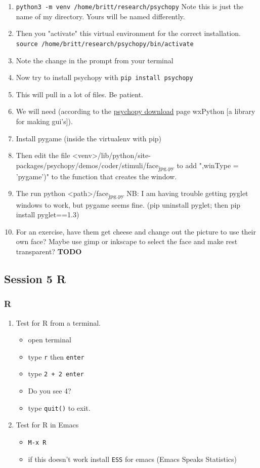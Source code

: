\documentclass{article}
\begin{document}
\begin{enumerate}
\begin{enumerate}
\begin{enumerate}
\begin{enumerate}
\item \texttt{python3 -m venv /home/britt/research/psychopy}
Note this is just the name of my directory. Yours will be named differently.
\item Then you "activate" this virtual environment for the correct installation.
\texttt{source /home/britt/research/psychopy/bin/activate}
\item Note the change in the prompt from your terminal
\item Now try to install psychopy with
\texttt{pip install psychopy}
\item This will pull in  a lot of files. Be patient.
\item We will need (according to the \href{https://www.psychopy.org/download.html\#download}{psychopy download} page wxPython [a library for making gui's]).
\item Install pygame (inside the virtualenv with pip)
\item Then edit the file <venv>/lib/python/site-packages/psychopy/demos/coder/stimuli/face\textsubscript{jpg.py} to add ",winType = 'pygame')" to the function that creates the window.
\item The run python <path>/face\textsubscript{jpg.py}
NB: I am having trouble getting pyglet windows to work, but pygame seems fine. (pip uninstall pyglet; then pip install pyglet==1.3)
\item For an exercise, have them get cheese and change out the picture to use their own face? Maybe use gimp or inkscape to select the face and make rest transparent? \textbf{\textbf{TODO}}
\end{enumerate}
\end{enumerate}
\end{enumerate}
\end{enumerate}
\subsection{Session 5 R}
\label{sec:orgca28fd2}
\subsubsection{R}
\label{sec:orgba00eba}
\begin{enumerate}
\item Test for R from a terminal.
\begin{itemize}
\item open terminal
\item type \texttt{r} then \texttt{enter}
\item type \texttt{2 + 2 enter}
\item Do you see 4?
\item type \texttt{quit()} to exit.
\end{itemize}
\item Test for R in Emacs
\begin{itemize}
\item \texttt{M-x R}
\item if this doesn't work install \texttt{ESS} for emacs (Emacs Speaks Statistics)
\end{itemize}
\end{enumerate}
\end{document}
